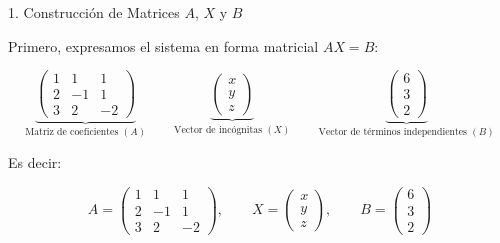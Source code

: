 \documentclass[10pt, aspectratio=169]{beamer}
\begin{document}
	\begin{frame}{1. Construcción de Matrices $A$, $X$ y $B$}

	
	Primero, expresamos el sistema en forma matricial $AX = B$:
	
	\bigskip
	
	\[
	\underbrace{
		\begin{pmatrix} 1 & 1 & 1 \\ 2 & -1 & 1 \\ 3 & 2 & -2 \end{pmatrix}
	}_{\text{Matriz de coeficientes } (A)}
	\qquad
	\underbrace{
		\begin{pmatrix} x \\ y \\ z \end{pmatrix}
	}_{\text{Vector de incógnitas } (X)}
	\qquad
	\underbrace{
		\begin{pmatrix} 6 \\ 3 \\ 2 \end{pmatrix}
	}_{\text{Vector de términos independientes } (B)}
	\]
	
	\bigskip
	
	\noindent Es decir:
	
	\[
	A = \begin{pmatrix} 1 & 1 & 1 \\ 2 & -1 & 1 \\ 3 & 2 & -2 \end{pmatrix},
	\qquad
	X = \begin{pmatrix} x \\ y \\ z \end{pmatrix},
	\qquad
	B = \begin{pmatrix} 6 \\ 3 \\ 2 \end{pmatrix}
	\]
	\end{frame}
\end{document}
